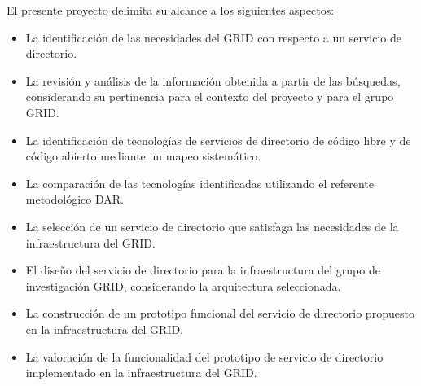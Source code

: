 \vspace*{0.7cm}

El presente proyecto delimita su alcance a los siguientes aspectos:

\begin{itemize}
	\item La identificación de las necesidades del \ac{GRID} con respecto a un servicio de directorio.
	\item La revisión y análisis de la información obtenida a partir de las búsquedas, considerando su pertinencia para el contexto del proyecto y para el grupo \ac{GRID}.
	\item La identificación de tecnologías de servicios de directorio de código libre y de código abierto mediante un mapeo sistemático.
	\item La comparación de las tecnologías identificadas utilizando el referente metodológico \ac{DAR}.
	\item La selección de un servicio de directorio que satisfaga las necesidades de la infraestructura del \ac{GRID}.
	\item El diseño del servicio de directorio para la infraestructura del grupo de investigación \ac{GRID}, considerando la arquitectura seleccionada.
	\item La construcción de un prototipo funcional del servicio de directorio propuesto en la infraestructura del \ac{GRID}.
	\item La valoración de la funcionalidad del prototipo de servicio de directorio implementado en la infraestructura del \ac{GRID}.
\end{itemize}
